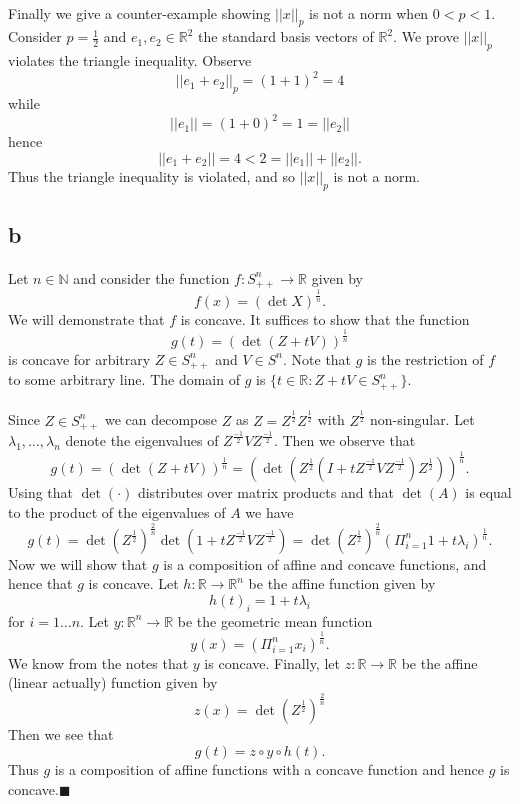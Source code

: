 \documentclass[letterpaper,12pt,oneside,onecolumn]{article}
\newcommand{\N}{\mathbb{N}} \newcommand{\R}{\mathbb{R}}
\begin{document}
\paragraph{}
Finally we give a counter-example showing $||x||_p$ is not a norm when $0 < p < 1$. Consider $p =\frac{1}{2}$ and $e_1, e_2 \in \R^2$ the standard basis vectors of $\R^2$. We prove $||x||_p$ violates the triangle inequality. Observe
$$||e_1 + e_2 ||_p = (1 + 1)^2 = 4$$
while 
$$||e_1|| = (1+0)^2 = 1 = ||e_2||$$
hence 
$$||e_1 + e_2||  = 4 < 2 = ||e_1|| + ||e_2||.$$
Thus the triangle inequality is violated, and so $||x||_p$ is not a norm.
\subsection{b}
\paragraph{}
Let $n \in \N$ and consider the function $f: S^n_{++} \rightarrow \R$ given by
$$f(x) = (\det X)^\frac{1}{n}.$$
We will demonstrate that $f$ is concave. It suffices to show that the function 
$$g(t) = (\det (Z + t V))^\frac{1}{n} $$
is concave for arbitrary $Z \in S^n_{++}$ and $V \in S^n$. Note that $g$ is the restriction of $f$ to some arbitrary line. The domain of $g$ is $\{t \in \R: Z + tV \in S^n_{++}\}$.
\paragraph{}
Since $Z \in S^n_{++}$ we can decompose $Z$ as $Z=Z^\frac{1}{2}Z^\frac{1}{2}$ with $Z^\frac{1}{2}$ non-singular. Let $\lambda_1, \dots, \lambda_n$ denote the eigenvalues of $Z^\frac{-1}{2}VZ^\frac{-1}{2}$. Then we observe that
$$g(t) = (\det(Z+tV))^\frac{1}{n} = (\det(Z^\frac{1}{2}(I + tZ^\frac{-1}{2}VZ^\frac{-1}{2})Z^\frac{1}{2}))^\frac{1}{n}.$$
Using that $\det(\cdot)$ distributes over matrix products and that $\det(A)$ is equal to the product of the eigenvalues of $A$ we have
$$g(t) = \det(Z^\frac{1}{2})^\frac{2}{n}\det(1 + tZ^\frac{-1}{2}VZ^\frac{-1}{2}) = \det(Z^\frac{1}{2})^\frac{2}{n}(\Pi_{i=1}^n 1+t\lambda_i)^\frac{1}{n}.$$
Now we will show that $g$ is a composition of affine and concave functions, and hence that $g$ is concave. Let $h : \R \rightarrow \R^n$ be the affine function given by
$$h(t)_i = 1+t\lambda_i$$
for $i = 1\dots n$. Let $ y : \R^n \rightarrow \R$ be the geometric mean function
$$y(x) = (\Pi_{i=1}^n x_i)^\frac{1}{n}.$$
We know from the notes that $y$ is concave. Finally, let $z: \R\rightarrow \R$ be the affine (linear actually) function given by
$$z(x) = \det(Z^\frac{1}{2})^\frac{2}{n}$$
Then we see that
$$g(t) = z\circ y\circ h(t).$$
Thus $g$ is a composition of affine functions with a concave function and hence $g$ is concave.$\blacksquare$
\end{document}
